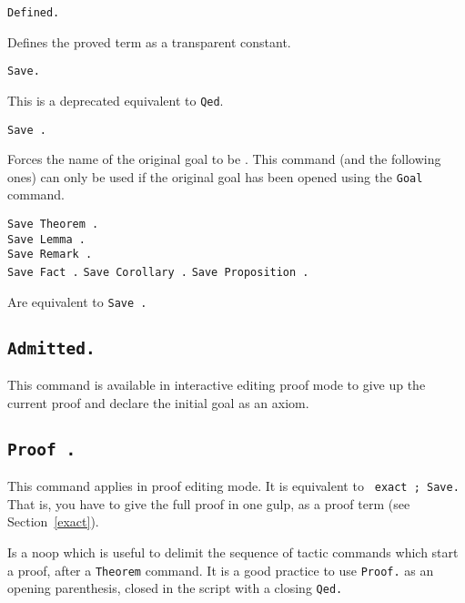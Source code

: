 \begin{Variants}

\item {\tt Defined.}
\label{Defined} 

  Defines the proved term as a transparent constant.

\item {\tt Save.}

  This is a deprecated equivalent to {\tt Qed}.

\item {\tt Save {\ident}.}
  
  Forces the name of the original goal to be {\ident}.  This command
  (and the following ones) can only be used if the original goal has
  been opened using the {\tt Goal} command.

\item {\tt Save Theorem {\ident}.} \\
 {\tt Save Lemma {\ident}.} \\
 {\tt Save Remark {\ident}.}\\
 {\tt Save Fact {\ident}.}
 {\tt Save Corollary {\ident}.}
 {\tt Save Proposition {\ident}.}

  Are equivalent to {\tt Save {\ident}.} 
\end{Variants}

\subsection[\tt Admitted.]{\tt Admitted.\label{Admitted}}
This command is available in interactive editing proof mode to give up
the current proof and declare the initial goal as an axiom.

\subsection[\tt Proof {\term}.]{\tt Proof {\term}.
\label{BeginProof}}
This command applies in proof editing mode. It is equivalent to {\tt
  exact {\term}; Save.} That is, you have to give the full proof in
one gulp, as a proof term (see Section~\ref{exact}).

  
  Is a noop which is useful to delimit the sequence of tactic commands
  which start a proof, after a {\tt Theorem} command.  It is a good
  practice to use {\tt Proof.} as an opening parenthesis, closed in
  the script with a closing {\tt Qed.}

